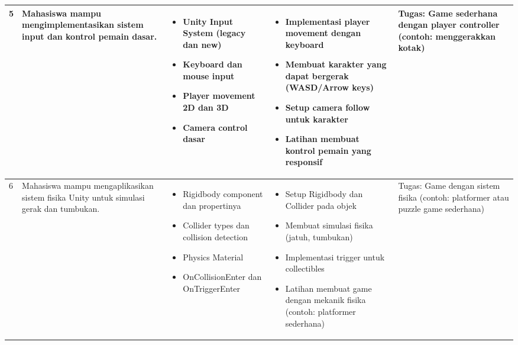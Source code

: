 \documentclass[a4paper,12pt]{article}
\begin{document}
\begin{longtable}{|p{0.8cm}|p{3.5cm}|p{4cm}|p{4cm}|p{2.5cm}|}
5 & Mahasiswa mampu mengimplementasikan sistem input dan kontrol pemain dasar. & 
\begin{itemize}[leftmargin=*,nosep]
\item Unity Input System (legacy dan new)
\item Keyboard dan mouse input
\item Player movement 2D dan 3D
\item Camera control dasar
\end{itemize} & 
\begin{itemize}[leftmargin=*,nosep]
\item Implementasi player movement dengan keyboard
\item Membuat karakter yang dapat bergerak (WASD/Arrow keys)
\item Setup camera follow untuk karakter
\item Latihan membuat kontrol pemain yang responsif
\end{itemize} & 
Tugas: Game sederhana dengan player controller (contoh: menggerakkan kotak) \\
\hline

6 & Mahasiswa mampu mengaplikasikan sistem fisika Unity untuk simulasi gerak dan tumbukan. & 
\begin{itemize}[leftmargin=*,nosep]
\item Rigidbody component dan propertinya
\item Collider types dan collision detection
\item Physics Material
\item OnCollisionEnter dan OnTriggerEnter
\end{itemize} & 
\begin{itemize}[leftmargin=*,nosep]
\item Setup Rigidbody dan Collider pada objek
\item Membuat simulasi fisika (jatuh, tumbukan)
\item Implementasi trigger untuk collectibles
\item Latihan membuat game dengan mekanik fisika (contoh: platformer sederhana)
\end{itemize} & 
Tugas: Game dengan sistem fisika (contoh: platformer atau puzzle game sederhana) \\
\hline


\end{longtable}
\end{document}
